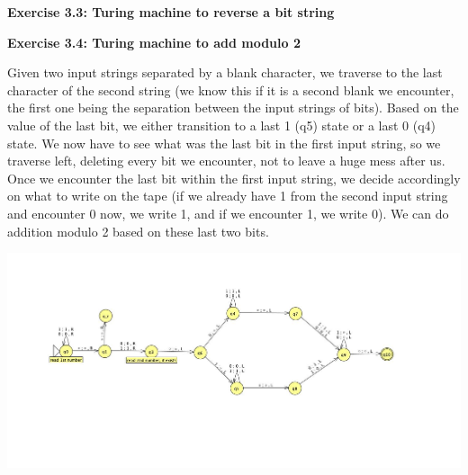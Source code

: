 \documentclass{article}
\begin{document}
\bigskip

\begin{framed}
    \noindent \textbf{Exercise 3.3: Turing machine to reverse a bit string}
    
    \medskip
    
    
\end{framed}

\bigskip

\begin{framed}
    \noindent \textbf{Exercise 3.4: Turing machine to add modulo 2}

    \medskip

    Given two input strings separated by a blank character, we traverse to the last character of the second string (we know this if it is a second blank we encounter, the first one being the separation between the input strings of bits). Based on the value of the last bit, we either transition to a last 1 (q5) state or a last 0 (q4) state. We now have to see what was the last bit in the first input string, so we traverse left, deleting every bit we encounter, not to leave a huge mess after us. Once we encounter the last bit within the first input string, we decide accordingly on what to write on the tape (if we already have 1 from the second input string and encounter 0 now, we write 1, and if we encounter 1, we write 0). We can do addition modulo 2 based on these last two bits.
    
    \begin{center}
        \includegraphics[width=1.1\textwidth]{images/3.4TM.jpg}
    \end{center}


\end{framed}
\end{document}
